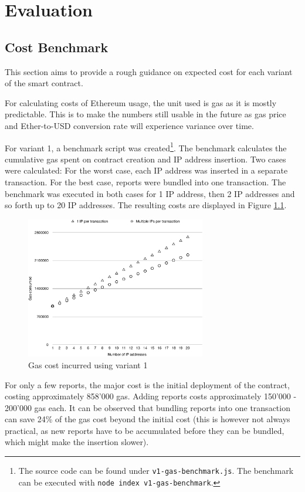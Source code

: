 \chapter{Evaluation}

\section{Cost Benchmark}

This section aims to provide a rough guidance on expected cost for each variant of the smart contract.

For calculating costs of Ethereum usage, the unit used is gas as it is mostly predictable. This is to make the numbers still usable in the future as gas price and Ether-to-USD conversion rate will experience variance over time.

For variant 1, a benchmark script was created\footnote{The source code can be found under \texttt{v1-gas-benchmark.js}. The benchmark can be executed with \texttt{node index v1-gas-benchmark}.}. The benchmark calculates the cumulative gas spent on contract creation and IP address insertion. Two cases were calculated: For the worst case, each IP address was inserted in a separate transaction. For the best case, reports were bundled into one transaction. The benchmark was executed in both cases for 1 IP address, then 2 IP addresses and so forth up to 20 IP addresses. The resulting costs are displayed in Figure \ref{fig:v1-gas-cost}.

\begin{figure}[H]
\centering
\includegraphics[width=0.7\textwidth]{v1-gas-cost.pdf}
\caption{Gas cost incurred using variant 1}
\label{fig:v1-gas-cost}
\end{figure}

For only a few reports, the major cost is the initial deployment of the contract, costing approximately 858'000 gas. Adding reports costs approximately 150'000 - 200'000 gas each.
It can be observed that bundling reports into one transaction can save 24\% of the gas cost beyond the initial cost (this is however not always practical, as new reports have to be accumulated before they can be bundled, which might make the insertion slower).

